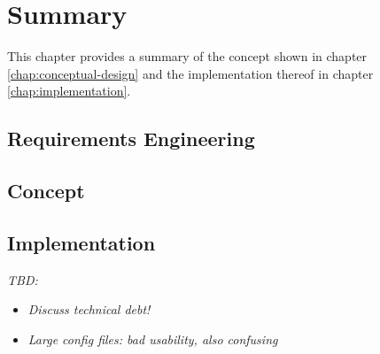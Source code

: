 \chapter{Summary}
\label{chap:summary}
This chapter provides a summary of the concept shown in chapter \ref{chap:conceptual-design} and the implementation thereof in chapter \ref{chap:implementation}.

\section{Requirements Engineering}
\label{sec:summary-requirements-engineering}

\section{Concept}
\label{sec:summary-concept}

\section{Implementation}
\label{sec:summary-implementation}
\emph{TBD:}
\begin{itemize}
    \item \emph{Discuss technical debt!}
    \item \emph{Large config files: bad usability, also confusing}
\end{itemize}